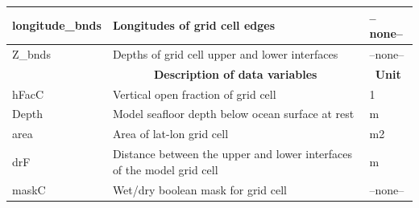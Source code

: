 \begin{longtable}{|m{}|m{}|m{}|}
longitude\_bnds &Longitudes of grid cell edges &--none--  \\ \hline
Z\_bnds &Depths of grid cell upper and lower interfaces &--none--  \\ \hline
\rowcolor{lightgray} \multicolumn{1}{|c|}{\textbf{Variables}} & \multicolumn{1}{|c|}{\textbf{Description of data variables}} &  \multicolumn{1}{|c|}{\textbf{Unit}}\\ \hline
hFacC &Vertical open fraction of grid cell &1  \\ \hline
Depth &Model seafloor depth below ocean surface at rest &m  \\ \hline
area &Area of lat-lon grid cell &m2  \\ \hline
drF &Distance between the upper and lower interfaces of the model grid cell &m  \\ \hline
maskC &Wet/dry boolean mask for grid cell &--none--  \\ \hline
\end{longtable}

\newp
\pagebreak
